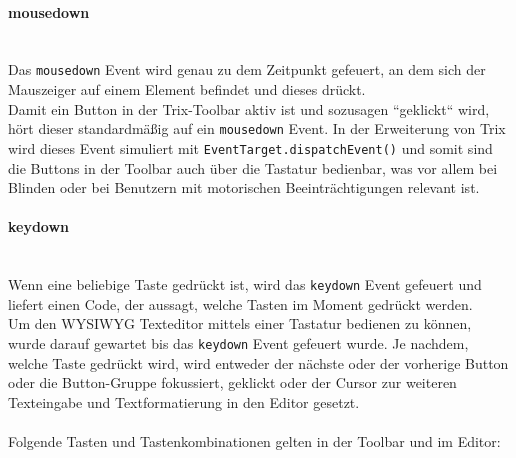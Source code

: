 \paragraph{mousedown}\mbox{}\\
Das \texttt{mousedown} Event wird genau zu dem Zeitpunkt gefeuert, an dem sich der Mauszeiger auf einem Element befindet und dieses drückt.\\
Damit ein Button in der Trix-Toolbar aktiv ist und sozusagen ``geklickt`` wird, hört dieser standardmäßig auf ein \texttt{mousedown} Event. In der Erweiterung von Trix wird dieses Event simuliert mit \texttt{EventTarget.dispatchEvent()} und somit sind die Buttons in der Toolbar auch über die Tastatur bedienbar, was vor allem bei Blinden oder bei Benutzern mit motorischen Beeinträchtigungen relevant ist.

\paragraph{keydown}\mbox{}\\
Wenn eine beliebige Taste gedrückt ist, wird das \texttt{keydown} Event gefeuert und liefert einen Code, der aussagt, welche Tasten im Moment gedrückt werden.\\
Um den WYSIWYG Texteditor mittels einer Tastatur bedienen zu können, wurde darauf gewartet bis das \texttt{keydown} Event gefeuert wurde. Je nachdem, welche Taste gedrückt wird, wird entweder der nächste oder der vorherige Button oder die Button-Gruppe fokussiert, geklickt oder der Cursor zur weiteren Texteingabe und Textformatierung in den Editor gesetzt.\\
\\Folgende Tasten und Tastenkombinationen gelten in der Toolbar und im Editor:

